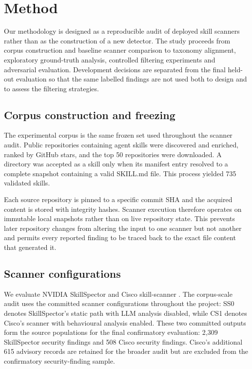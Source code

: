 \documentclass[conference]{IEEEtran}
\begin{document}
\section{Method}

Our methodology is designed as a reproducible audit of deployed skill scanners rather than as the construction of a new detector. The study proceeds from corpus construction and baseline scanner comparison to taxonomy alignment, exploratory ground-truth analysis, controlled filtering experiments and adversarial evaluation. Development decisions are separated from the final held-out evaluation so that the same labelled findings are not used both to design and to assess the filtering strategies.

\subsection{Corpus construction and freezing}

The experimental corpus is the same frozen set used throughout the scanner audit. Public repositories containing agent skills were discovered and enriched, ranked by GitHub stars, and the top 50 repositories were downloaded. A directory was accepted as a skill only when its manifest entry resolved to a complete snapshot containing a valid SKILL.md file. This process yielded 735 validated skills.

Each source repository is pinned to a specific commit SHA and the acquired content is stored with integrity hashes. Scanner execution therefore operates on immutable local snapshots rather than on live repository state. This prevents later repository changes from altering the input to one scanner but not another and permits every reported finding to be traced back to the exact file content that generated it.

\subsection{Scanner configurations}

We evaluate NVIDIA SkillSpector \cite{ref6} and Cisco skill-scanner \cite{ref7}. The corpus-scale audit uses the committed scanner configurations throughout the project: SS0 denotes SkillSpector's static path with LLM analysis disabled, while CS1 denotes Cisco's scanner with behavioural analysis enabled. These two committed outputs form the source populations for the final confirmatory evaluation: 2,309 SkillSpector security findings and 508 Cisco security findings. Cisco's additional 615 advisory records are retained for the broader audit but are excluded from the confirmatory security-finding sample.
\end{document}

